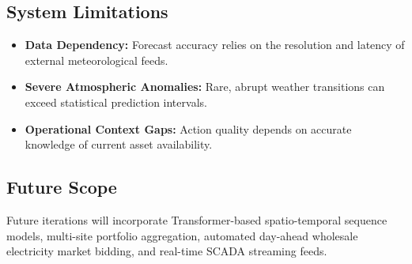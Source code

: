 \subsection{System Limitations}
\label{subsec:limitations}

\begin{itemize}[leftmargin=1.5em, itemsep=0.15em]
    \item \textbf{Data Dependency:} Forecast accuracy relies on the resolution and latency of external meteorological feeds.
    \item \textbf{Severe Atmospheric Anomalies:} Rare, abrupt weather transitions can exceed statistical prediction intervals.
    \item \textbf{Operational Context Gaps:} Action quality depends on accurate knowledge of current asset availability.
\end{itemize}

\subsection{Future Scope}
\label{subsec:future_scope}

Future iterations will incorporate Transformer-based spatio-temporal sequence models, multi-site portfolio aggregation, automated day-ahead wholesale electricity market bidding, and real-time SCADA streaming feeds.
